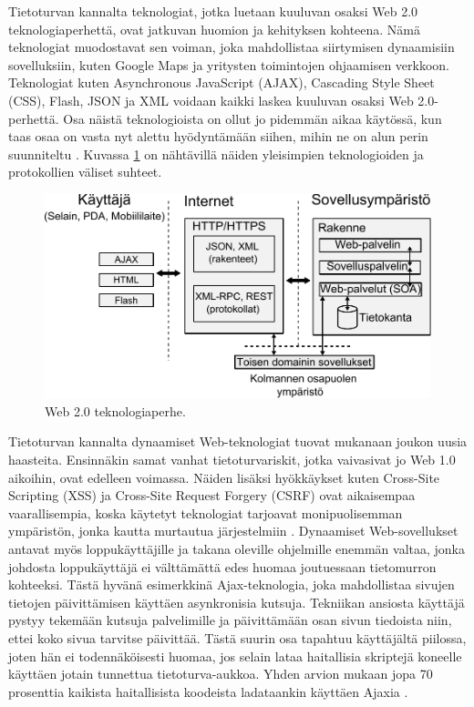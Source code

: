 Tietoturvan kannalta teknologiat, jotka luetaan kuuluvan osaksi Web 2.0
teknologiaperhettä, ovat jatkuvan huomion ja kehityksen kohteena. Nämä teknologiat
muodostavat sen voiman, joka mahdollistaa siirtymisen dynaamisiin
sovelluksiin, kuten Google Maps ja yritysten toimintojen ohjaamisen verkkoon.
Teknologiat kuten Asynchronous JavaScript (AJAX), Cascading Style Sheet (CSS),
Flash, JSON ja XML voidaan kaikki laskea kuuluvan osaksi Web 2.0-perhettä.
Osa näistä teknologioista on ollut jo pidemmän aikaa käytössä, kun taas osaa on
vasta nyt alettu hyödyntämään siihen, mihin ne on alun perin suunniteltu \cite{WEB2}.
Kuvassa \ref{web} on nähtävillä näiden yleisimpien teknologioiden ja protokollien
väliset suhteet.

\begin{figure}[htp]
\centering
\includegraphics[width=12cm]{pics/web_ymparisto.pdf}
\caption{Web 2.0 teknologiaperhe.}
\label{web}
\end{figure}

Tietoturvan kannalta dynaamiset Web-teknologiat tuovat mukanaan joukon uu\-si\-a haasteita. Ensinnäkin
samat vanhat tietoturvariskit, jotka vaivasivat jo Web 1.0 aikoihin, ovat edelleen voimassa. Näiden lisäksi
hyökkäykset kuten Cross-Site Scripting (XSS) ja Cross-Site Request Forgery (CSRF) 
ovat aikaisempaa vaarallisempia, koska käytetyt teknologiat tarjoavat
monipuolisemman ympäristön, jonka kautta murtautua järjestelmiin \cite{WEB2}. Dynaamiset
Web-sovellukset antavat myös loppukäyttäjille ja takana oleville ohjelmille enemmän
valtaa, jonka johdosta loppukäyttäjä ei välttämättä edes huomaa joutuessaan
tietomurron kohteeksi. Tästä hyvänä esimerkkinä Ajax-teknologia, joka mahdollistaa
sivujen tietojen päivittämisen käyttäen asynkronisia kutsuja. Tekniikan ansiosta
käyttäjä pystyy tekemään kutsuja palvelimille ja päivittämään osan sivun
tiedoista niin, ettei koko sivua tarvitse päivittää. Tästä suurin osa tapahtuu
käyttäjältä piilossa, joten hän ei todennäköisesti huomaa, jos selain lataa
haitallisia skriptejä koneelle käyttäen jotain tunnettua tietoturva-aukkoa. Yhden
arvion mukaan jopa 70 prosenttia kaikista haitallisista koodeista ladataankin käyttäen
Ajaxia \cite{WEB2c}.

